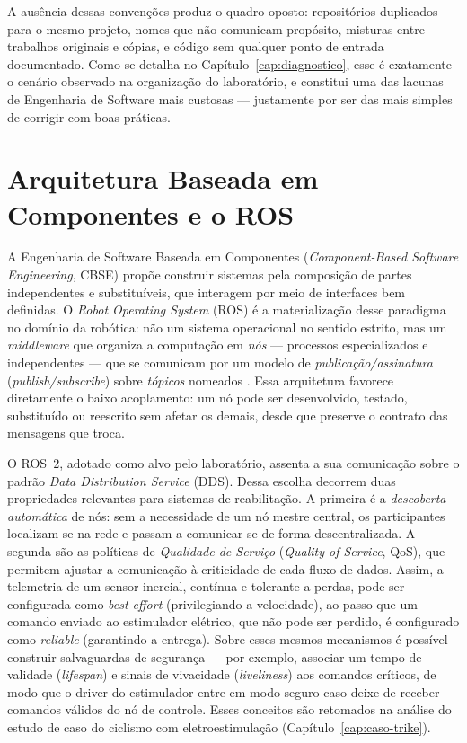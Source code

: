 A ausência dessas convenções produz o quadro oposto: repositórios duplicados para o mesmo
projeto, nomes que não comunicam propósito, misturas entre trabalhos originais e cópias, e
código sem qualquer ponto de entrada documentado. Como se detalha no
Capítulo~\ref{cap:diagnostico}, esse é exatamente o cenário observado na organização do
laboratório, e constitui uma das lacunas de Engenharia de Software mais custosas ---
justamente por ser das mais simples de corrigir com boas práticas.

\section{Arquitetura Baseada em Componentes e o ROS}
\label{sec:ros}

A Engenharia de Software Baseada em Componentes (\emph{Component-Based Software
Engineering}, CBSE) propõe construir sistemas pela composição de partes independentes e
substituíveis, que interagem por meio de interfaces bem definidas. O \emph{Robot Operating
System} (ROS) é a materialização desse paradigma no domínio da robótica: não um sistema
operacional no sentido estrito, mas um \emph{middleware} que organiza a computação em
\emph{nós} --- processos especializados e independentes --- que se comunicam por um modelo
de \emph{publicação/assinatura} (\emph{publish/subscribe}) sobre \emph{tópicos}
nomeados \cite{ros2docs}. Essa arquitetura favorece diretamente o baixo acoplamento: um nó
pode ser desenvolvido, testado, substituído ou reescrito sem afetar os demais, desde que
preserve o contrato das mensagens que troca.

O ROS~2, adotado como alvo pelo laboratório, assenta a sua comunicação sobre o padrão
\emph{Data Distribution Service} (DDS). Dessa escolha decorrem duas propriedades relevantes
para sistemas de reabilitação. A primeira é a \emph{descoberta automática} de nós: sem a
necessidade de um nó mestre central, os participantes localizam-se na rede e passam a
comunicar-se de forma descentralizada. A segunda são as políticas de \emph{Qualidade de
Serviço} (\emph{Quality of Service}, QoS), que permitem ajustar a comunicação à criticidade
de cada fluxo de dados. Assim, a telemetria de um sensor inercial, contínua e tolerante a
perdas, pode ser configurada como \emph{best effort} (privilegiando a velocidade), ao passo
que um comando enviado ao estimulador elétrico, que não pode ser perdido, é configurado
como \emph{reliable} (garantindo a entrega). Sobre esses mesmos mecanismos é possível
construir salvaguardas de segurança --- por exemplo, associar um tempo de validade
(\emph{lifespan}) e sinais de vivacidade (\emph{liveliness}) aos comandos críticos, de modo
que o driver do estimulador entre em modo seguro caso deixe de receber comandos válidos do
nó de controle. Esses conceitos são retomados na análise do estudo de caso do ciclismo com
eletroestimulação (Capítulo~\ref{cap:caso-trike}).

